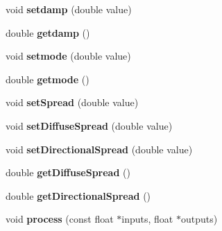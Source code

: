 \begin{DoxyCompactItemize}
\item 
\hypertarget{class_ambisonic_freeverb_aebddbbfa331b9de3025fc714a514b8f4}{void {\bfseries setdamp} (double value)}\label{class_ambisonic_freeverb_aebddbbfa331b9de3025fc714a514b8f4}

\item 
\hypertarget{class_ambisonic_freeverb_a8d52d94300b878036f47a9111c0db53d}{double {\bfseries getdamp} ()}\label{class_ambisonic_freeverb_a8d52d94300b878036f47a9111c0db53d}

\item 
\hypertarget{class_ambisonic_freeverb_a3b08b247c1f5f3207484e80a8a1f79e9}{void {\bfseries setmode} (double value)}\label{class_ambisonic_freeverb_a3b08b247c1f5f3207484e80a8a1f79e9}

\item 
\hypertarget{class_ambisonic_freeverb_a8c5d6630840a73c60880e2dbee5f22dc}{double {\bfseries getmode} ()}\label{class_ambisonic_freeverb_a8c5d6630840a73c60880e2dbee5f22dc}

\item 
\hypertarget{class_ambisonic_freeverb_a16c067aa3294b44ec9ff865dd01ce72c}{void {\bfseries set\-Spread} (double value)}\label{class_ambisonic_freeverb_a16c067aa3294b44ec9ff865dd01ce72c}

\item 
\hypertarget{class_ambisonic_freeverb_a42331b8bdc00b679c0a601a7411aebdf}{void {\bfseries set\-Diffuse\-Spread} (double value)}\label{class_ambisonic_freeverb_a42331b8bdc00b679c0a601a7411aebdf}

\item 
\hypertarget{class_ambisonic_freeverb_aac2ae43a5c6d31adc05c1ee08ce022c0}{void {\bfseries set\-Directional\-Spread} (double value)}\label{class_ambisonic_freeverb_aac2ae43a5c6d31adc05c1ee08ce022c0}

\item 
\hypertarget{class_ambisonic_freeverb_a5f11b83ed6a2f2cc907cecabf8df3b31}{double {\bfseries get\-Diffuse\-Spread} ()}\label{class_ambisonic_freeverb_a5f11b83ed6a2f2cc907cecabf8df3b31}

\item 
\hypertarget{class_ambisonic_freeverb_a249b3173e49fb8cb3ad1daf519e97357}{double {\bfseries get\-Directional\-Spread} ()}\label{class_ambisonic_freeverb_a249b3173e49fb8cb3ad1daf519e97357}

\item 
\hypertarget{class_ambisonic_freeverb_a15cfb9234ddc3661497a9806650f03f2}{void {\bfseries process} (const float $\ast$inputs, float $\ast$outputs)}\label{class_ambisonic_freeverb_a15cfb9234ddc3661497a9806650f03f2}


\end{DoxyCompactItemize}
